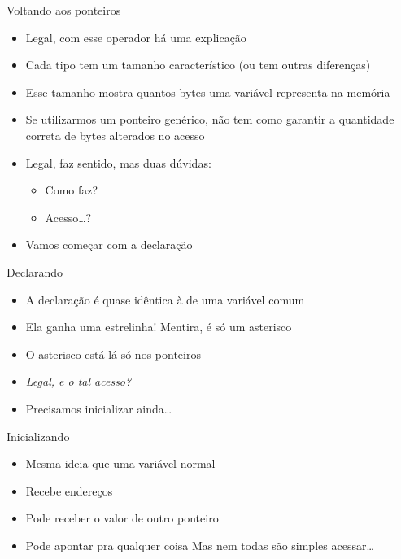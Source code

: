 \documentclass[14pt]{beamer}
\begin{document}
		\begin{frame}{Voltando aos ponteiros}
			\begin{itemize}
				\presentationPause\item Legal, com esse operador há uma explicação
				\presentationPause\item Cada tipo tem um tamanho característico (ou tem outras diferenças)
				\presentationPause\item Esse tamanho mostra quantos bytes uma variável representa na memória
				\presentationPause\item Se utilizarmos um ponteiro genérico, não tem como garantir a quantidade correta de bytes alterados no acesso
				\presentationPause\item Legal, faz sentido, mas duas dúvidas:
				\begin{itemize}
					\presentationPause\item Como faz?
					\presentationPause\item Acesso\dots?
				\end{itemize}
				\presentationPause\item Vamos começar com a declaração
			\end{itemize}
		\end{frame}

		\begin{frame}{Declarando}
			\begin{itemize}
				\presentationPause\item A declaração é quase idêntica à de uma variável comum
				\presentationPause\item Ela ganha uma estrelinha! \presentationPause Mentira, é só um asterisco \basicCode{*}
				\presentationPause\item O asterisco está lá só nos ponteiros
			\end{itemize}
			\presentationPause
			\begin{itemize}
				\presentationPause\item \textit{Legal, e o tal acesso?}
				\presentationPause\item Precisamos inicializar ainda\dots
			\end{itemize}
		\end{frame}

		\begin{frame}{Inicializando}
			\begin{itemize}
				\presentationPause\item Mesma ideia que uma variável normal
				\presentationPause\item Recebe endereços
				\presentationPause\item Pode receber o valor de outro ponteiro
				\presentationPause\item Pode apontar pra qualquer coisa \presentationPause Mas nem todas são simples acessar\dots
			\end{itemize}
			\presentationPause
		\end{frame}
\end{document}
